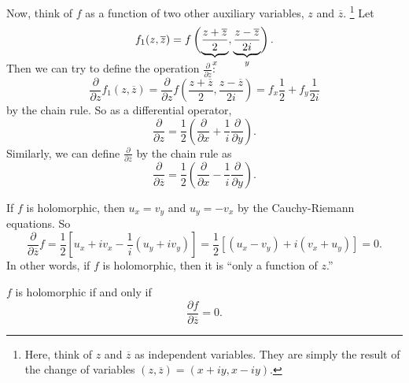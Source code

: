 Now, think of $f$ as a function of two other auxiliary
variables, $z$ and $\overline{z}$.
\footnote{Here, think of $z$ and $\overline{z}$ as
  independent variables. They are simply the result of
  the change of variables
  $(z, \overline{z}) = (x + iy, x - iy)$.}
Let
\[
  f_1(z, \overline{z}) = f\left(\smash[b]{\underbrace{\frac{z + \overline{z}}{2}}_{x}}, \smash[b]{\underbrace{\frac{z - \overline{z}}{2i}}_{y}}\right)
.\]
Then we can try to define the operation
$\frac{\partial}{\partial z}$:
\[
\frac{\partial}{\partial z} f_1(z, \overline{z}) =
\frac{\partial}{\partial z} f\left(\frac{z + \overline{z}}{2}, \frac{z - \overline{z}}{2i}\right) =
f_x \frac{1}{2} + f_y \frac{1}{2i}
\]
by the chain rule. So as a differential operator,
\[
\frac{\partial}{\partial z} = \frac{1}{2} \left(\frac{\partial}{\partial x} + \frac{1}{i} \frac{\partial}{\partial y}\right)
.\]
Similarly, we can define
$\frac{\partial}{\partial \overline{z}}$ by the chain rule
as
\[
\frac{\partial}{\partial \overline{z}} = \frac{1}{2} \left(\frac{\partial}{\partial x} - \frac{1}{i}\frac{\partial}{\partial y}\right)
.\]

If $f$ is holomorphic, then $u_x = v_y$ and $u_y = -v_x$
by the Cauchy-Riemann equations. So
\[
\frac{\partial}{\partial \overline{z}} f = \frac{1}{2}\left[u_x + iv_x - \frac{1}{i}(u_y + iv_y)\right]
= \frac{1}{2}\left[(u_x - v_y) + i(v_x + u_y)\right] = 0
.\]
In other words, if $f$ is holomorphic, then it is
``only a function of $z$.''

\begin{tcolorbox}[title=Theorem]
  $f$ is holomorphic if and only if
  \[
  \frac{\partial f}{\partial \overline{z}} = 0
  .\]
\end{tcolorbox}

